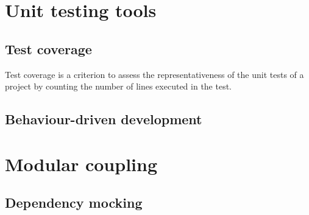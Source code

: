 \documentclass{article}
\begin{document}
\section{Unit testing tools}
\subsection{Test coverage}
Test coverage is a criterion to assess the representativeness of the unit tests of a project by counting the number of lines executed in the test.

\subsection{Behaviour-driven development}

\section{Modular coupling}

\subsection{Dependency mocking}
\end{document}
